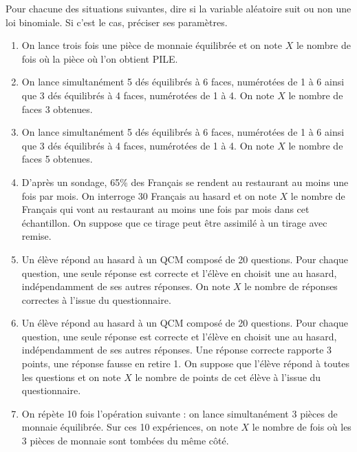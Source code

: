\documentclass[11pt,fleqn, openany]{book} %
\begin{document}
\begin{exercise}[topic=prob12]
Pour chacune des situations suivantes, dire si la variable aléatoire  suit ou non une loi binomiale. Si c'est le cas, préciser ses paramètres.

\begin{enumerate}
\item On lance trois fois une pièce de monnaie équilibrée et on note $X$ le nombre de fois où la pièce où l'on obtient PILE.
\item On lance simultanément 5 dés équilibrés à 6 faces, numérotées de 1 à 6 ainsi que 3 dés équilibrés à 4 faces, numérotées de 1 à 4. On note $X$ le nombre de faces 3 obtenues.
\item On lance simultanément 5 dés équilibrés à 6 faces, numérotées de 1 à 6 ainsi que 3 dés équilibrés à 4 faces, numérotées de 1 à 4. On note $X$ le nombre de faces 5 obtenues.
\item D'après un sondage, 65\% des Français se rendent au restaurant au moins une fois par mois. On interroge 30 Français au hasard et on note $X$ le nombre de Français qui vont au restaurant au moins une fois par mois dans cet échantillon. On suppose que ce tirage peut être assimilé à un tirage avec remise.
\item Un élève répond au hasard à un QCM composé de 20 questions. Pour chaque question, une seule réponse est correcte et l'élève en choisit une au hasard, indépendamment de ses autres réponses. On note $X$ le nombre de réponses correctes à l'issue du questionnaire.
\item Un élève répond au hasard à un QCM composé de 20 questions. Pour chaque question, une seule réponse est correcte et l'élève en choisit une au hasard, indépendamment de ses autres réponses. Une réponse correcte rapporte 3 points, une réponse fausse en retire 1. On suppose que l'élève répond à toutes les questions et on note $X$ le nombre de points de cet élève à l'issue du questionnaire.
\item On répète 10 fois l'opération suivante : on lance simultanément 3 pièces de monnaie équilibrée. Sur ces 10 expériences, on note $X$ le nombre de fois où les 3 pièces de monnaie sont tombées du même côté.
\end{enumerate}
\end{exercise}
\end{document}
